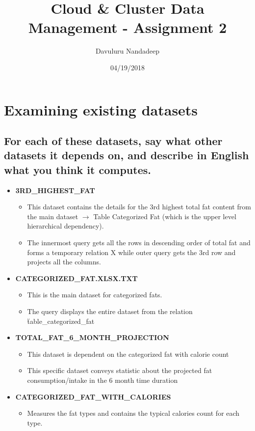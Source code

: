 \documentclass[a4paper]{article}
\title{Cloud \& Cluster Data Management - Assignment 2}
\author{Davuluru Nandadeep}
\date{04/19/2018}
\begin{document}
\maketitle

\section{Examining existing datasets}

\subsection{For each of these datasets, say what other datasets it depends on, and describe in English what you think it computes.}

\begin{itemize}
\item \textbf{3RD\_HIGHEST\_FAT}
	\begin{itemize}
	\item This dataset contains the details for the 3rd highest total fat content from the main dataset \(\rightarrow\) Table Categorized Fat (which is the upper level hierarchical dependency).
    \item The innermost query gets all the rows in descending order of total fat and forms a temporary relation X while outer query gets the 3rd row and projects all the columns. 
	\end{itemize}
\item \textbf{CATEGORIZED\_FAT.XLSX.TXT}
	\begin{itemize}
	\item This is the main dataset for categorized fats. 
    \item The query displays the entire dataset from the relation \"table\_categorized\_fat
	\end{itemize}
\item \textbf{TOTAL\_FAT\_6\_MONTH\_PROJECTION}
	\begin{itemize}
	\item This dataset is dependent on the categorized fat with calorie count
    \item This specific dataset conveys statistic about the projected fat consumption/intake in the 6 month time duration
	\end{itemize}
\item \textbf{CATEGORIZED\_FAT\_WITH\_CALORIES}
	\begin{itemize}
	\item Measures the fat types and contains the typical calories count for each type. 

\end{itemize}
\end{itemize}
\end{document}
